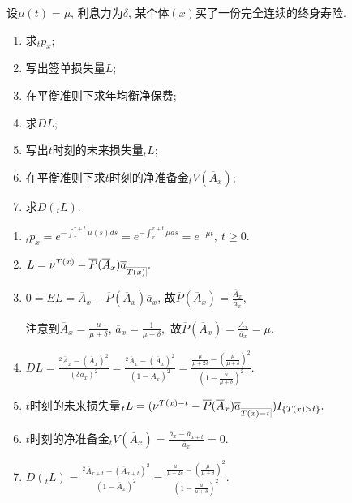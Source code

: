 \documentclass[lang=cn,10pt]{elegantbook}
\makeatletter
\DeclareRobustCommand{\annu}[1]{_{%
    \def\arraystretch{0}%
    \setlength\arraycolsep{1pt}%
    \setlength\arrayrulewidth{.2pt}%
    \begin{array}[b]{@{}c|}\hline
        \\[\arraycolsep]%
        \scriptstyle #1%
    \end{array}%
}}
\makeatother
\begin{document}
\begin{example}\label{l5.1}
    设$\mu(t)=\mu$, 利息力为$\delta$, 某个体$(x)$买了一份完全连续的终身寿险.
    \begin{enumerate}[(1)]
        \item 求${}_tp_x$;
        \item 写出签单损失量$L$;
        \item 在平衡准则下求年均衡净保费;
        \item 求$DL$;
        \item 写出$t$时刻的未来损失量${}_tL$;
        \item 在平衡准则下求$t$时刻的净准备金$_tV(\overline A_x)$;
        \item 求$D({}_tL).$
    \end{enumerate}
\end{example}
\begin{solution}
    \begin{enumerate}[(1)]
        \item $_tp_x=e^{-\int_x^{x+t}\mu(s)ds}=e^{-\int_x^{x+t}\mu ds}=e^{-\mu t},\ t\ge 0.$
        \item $L=\nu^{T(x)}-\overline P(\overline A_x)\overline a_{\annu {T(x)}}.$
        \item $0=EL=\overline A_x-\overline P(\overline A_x)\overline a_x$, 故$\overline P(\overline A_x)=\frac{\overline A_x}{\overline a_x},$

注意到$\overline A_x=\frac{\mu}{\mu+\delta}$, $\overline a_x=\frac{1}{\mu+\delta},$
故$\overline P(\overline A_x)=\frac{\overline A_x}{\overline a_x}=\mu.$
        \item $DL=\frac{^2\overline A_{x}-(\overline A_{x})^2}{(\delta\overline a_x)^2}=\frac{^2\overline A_{x}-(\overline A_{x})^2}{(1-\overline A_x)^2}=\frac{\frac{\mu}{\mu+2\delta}-(\frac{\mu}{\mu+\delta})^2}{(1-\frac{\mu}{\mu+\delta})^2}.$
        \item $t$时刻的未来损失量${}_tL= (\nu^{T(x)-t}-\overline{P}( \overline{A}_x )\overline a_{\annu {T(x)-t}} )I_{\{T(x)>t\}}.$
        \item $t$时刻的净准备金$ {}_tV(\overline A_x)=\frac{\overline a_{x}-\overline a_{x+t}}{\overline a_x}=0.$
        \item $D({}_tL)=\frac{^2\overline A_{x+t}-(\overline A_{x+t})^2}{(1-\overline A_x)^2}=\frac{\frac{\mu}{\mu+2\delta}-(\frac{\mu}{\mu+\delta})^2}{(1-\frac{\mu}{\mu+\delta})^2}.$ 
    \end{enumerate}
\end{solution}
\end{document}
